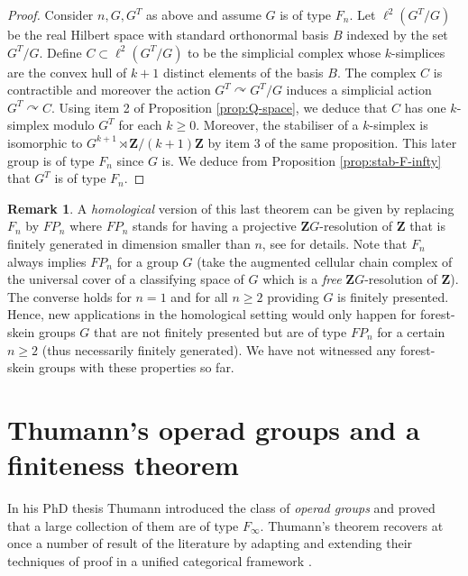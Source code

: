 \documentclass[a4paper, 12pt]{amsart}
\numberwithin{equation}{section}
\theoremstyle{definition}
\newtheorem{remark}[theorem]{Remark}
\newcommand{\act}{\curvearrowright}
\newcommand{\Z}{\mathbf{Z}}
\begin{document}
\begin{proof}
Consider $n,G,G^T$ as above and assume $G$ is of type $F_n$.
Let $\ell^2(G^T/G)$ be the real Hilbert space with standard orthonormal basis $B$ indexed by the set $G^T/G$. 
Define $C\subset \ell^2(G^T/G)$ to be the simplicial complex whose $k$-simplices are the convex hull of $k+1$ distinct elements of the basis $B$. 
The complex $C$ is contractible and moreover the action $G^T\act G^T/G$ induces a simplicial action $G^T\act C$.
Using item 2 of Proposition \ref{prop:Q-space}, we deduce that $C$ has one $k$-simplex modulo $G^T$ for each $k\geq 0$. 
Moreover, the stabiliser of a $k$-simplex is isomorphic to $G^{k+1}\rtimes \Z/(k+1)\Z$ by item 3 of the same proposition.
This later group is of type $F_n$ since $G$ is.
We deduce from Proposition \ref{prop:stab-F-infty} that $G^T$ is of type $F_n.$
\end{proof}

\begin{remark}\label{rem:FPm}
A {\it homological} version of this last theorem can be given by replacing $F_n$ by $FP_n$ where $FP_n$ stands for having a projective $\Z G$-resolution of $\Z$ that is finitely generated in dimension smaller than $n$, see \cite[Section 8]{Geoghegan-book} for details.
Note that $F_n$ always implies $FP_n$ for a group $G$ (take the augmented cellular chain complex of the universal cover of a classifying space of $G$ which is a {\it free} $\Z G$-resolution of $\Z$).
The converse holds for $n=1$ and for all $n\geq 2$ providing $G$ is finitely presented.
Hence, new applications in the homological setting would only happen for forest-skein groups $G$ that are not finitely presented but are of type $FP_n$ for a certain $n\geq 2$ (thus necessarily finitely generated). 
We have not witnessed any forest-skein groups with these properties so far.
\end{remark}

\section{Thumann's operad groups and a finiteness theorem}\label{sec:Thumann}
In his PhD thesis Thumann introduced the class of {\it operad groups} and proved that a large collection of them are of type $F_\infty$.
Thumann's theorem recovers at once a number of result of the literature by adapting and extending their techniques of proof in a unified categorical framework \cite{Thumann17}.
\end{document}

